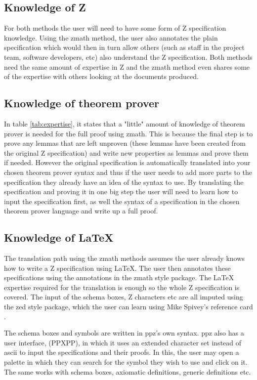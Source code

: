 \subsection{Knowledge of Z}
For both methods the user will need to have some form of Z specification
knowledge. Using the \gls{zmath} method, the user also annotates the plain
specification which would then in turn allow others (such as staff in the
project team, software developers, etc) also understand the Z specification.
Both methods need the same amount of expertise in Z and the \gls{zmath} method
even shares some of the expertise with others looking at the documents produced.

\subsection{Knowledge of theorem prover}
In table \ref{tab:expertise}, it states that a "little" amount of knowledge of
theorem prover is needed for the full proof using \gls{zmath}. This is because
the final step is to prove any lemmas that are left unproven (these lemmas have
been created from the original Z specification) and write new properties as
lemmas and prove them if needed. However the original specification is
automatically translated into your chosen theorem prover syntax and thus if the
user needs to add more parts to the specification they already have an idea of
the syntax to use. By translating the specification and proving it in one big
step the user will need to learn how to input the specification first, as well
the syntax of a specification in the chosen theorem prover language and write up
a full proof. 

\subsection{Knowledge of \LaTeX}
The translation path using the \gls{zmath} methods assumes the user already
knows how to write a Z specification using \LaTeX{}. The user then annotates
these specifications using the annotations in the \gls{zmath} style package. The
\LaTeX{} expertise required for the translation is enough so the whole Z
specification is covered. The input of the schema boxes, Z characters etc are
all imputed using the zed style package, which the user can learn using Mike
Spivey's reference card \cite{zrefcard}.

The schema boxes and symbols are written in \gls{ppz}'s own syntax. \gls{ppz}
also has a user interface, (PPXPP), in which it uses an extended character set
instead of ascii to input the specifications and their proofs. In this, the user
may open a palette in which they can search for the symbol they wish to use and
click on it. The same works with schema boxes, axiomatic definitions, generic
definitions etc. 

